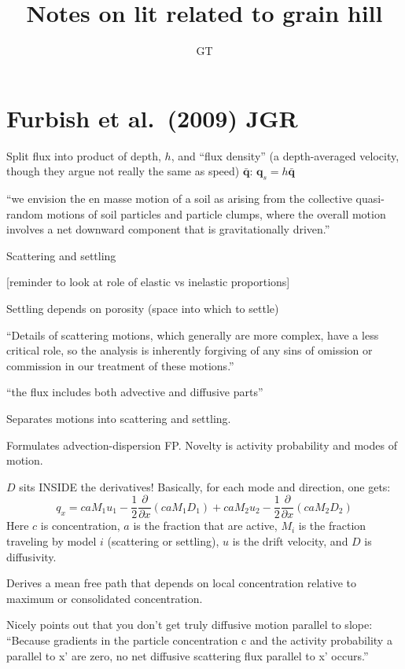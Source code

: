 \documentclass[12pt, oneside]{article}   	%
\title{Notes on lit related to grain hill}
\author{GT}
\begin{document}
\maketitle

\section*{Furbish et al.~(2009) JGR}

Split flux into product of depth, $h$, and ``flux density'' (a depth-averaged velocity, though they argue not really the same as speed) $\bar{\mathbf{q}}$: $\mathbf{q}_s = h \bar{\mathbf{q}}$

``we envision the en masse motion of a soil as arising from the collective quasi-random motions of soil particles and particle clumps, where the overall motion involves a net downward component that is gravitationally driven.''

Scattering and settling

[reminder to look at role of elastic vs inelastic proportions]

Settling depends on porosity (space into which to settle)

``Details of scattering motions, which generally are more complex, have a less critical role, so the analysis is inherently forgiving of any sins of omission or commission in our treatment of these motions.''

``the flux includes both advective and diffusive parts''

Separates motions into scattering and settling.

Formulates advection-dispersion FP. Novelty is activity probability and modes of motion.

$D$ sits INSIDE the derivatives! Basically, for each mode and direction, one gets:
\begin{equation}
q_x = c a M_1 u_1 - \frac{1}{2} \frac{\partial}{\partial x} ( c a M_1 D_1 ) +  c a M_2 u_2 - \frac{1}{2} \frac{\partial}{\partial x} ( c a M_2 D_2 )
\end{equation}
Here $c$ is concentration, $a$ is the fraction that are active, $M_i$ is the fraction traveling by model $i$ (scattering or settling), $u$ is the drift velocity, and $D$ is diffusivity.

Derives a mean free path that depends on local concentration relative to maximum or consolidated concentration.

Nicely points out that you don't get truly diffusive motion parallel to slope: ``Because gradients in the particle concentration c and the activity probability a parallel to x' are zero, no net diffusive scattering flux parallel to x' occurs.'' 
\end{document}

